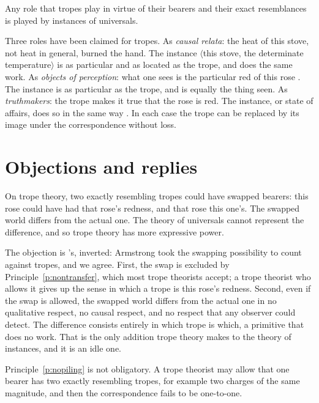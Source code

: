 \documentclass{situationist-preprint}
\begin{document}
\begin{corollary}\label{c:roles}
Any role that tropes play in virtue of their bearers and their exact resemblances is played by instances of universals.
\end{corollary}

Three roles have been claimed for tropes. As \emph{causal relata}: the heat of this stove, not heat in general, burned the hand. The instance $\langle$this stove, the determinate temperature$\rangle$ is as particular and as located as the trope, and does the same work. As \emph{objects of perception}: what one sees is the particular red of this rose \citep{MulliganSimonsSmith1984}. The instance is as particular as the trope, and is equally the thing seen. As \emph{truthmakers}: the trope makes it true that the rose is red. The instance, or state of affairs, does so in the same way \citep{Armstrong1997}. In each case the trope can be replaced by its image under the correspondence without loss.

\section{Objections and replies}

\begin{objection}[Swapping]\label{o:swap}
On trope theory, two exactly resembling tropes could have swapped bearers: this rose could have had that rose's redness, and that rose this one's. The swapped world differs from the actual one. The theory of universals cannot represent the difference, and so trope theory has more expressive power.
\end{objection}

\begin{reply}
The objection is \citet{Armstrong1989}'s, inverted: Armstrong took the swapping possibility to count against tropes, and we agree. First, the swap is excluded by Principle~\ref{p:nontransfer}, which most trope theorists accept; a trope theorist who allows it gives up the sense in which a trope is this rose's redness. Second, even if the swap is allowed, the swapped world differs from the actual one in no qualitative respect, no causal respect, and no respect that any observer could detect. The difference consists entirely in which trope is which, a primitive that does no work. That is the only addition trope theory makes to the theory of instances, and it is an idle one.
\end{reply}

\begin{objection}[Piling]\label{o:piling}
Principle~\ref{p:nopiling} is not obligatory. A trope theorist may allow that one bearer has two exactly resembling tropes, for example two charges of the same magnitude, and then the correspondence fails to be one-to-one.
\end{objection}
\end{document}
